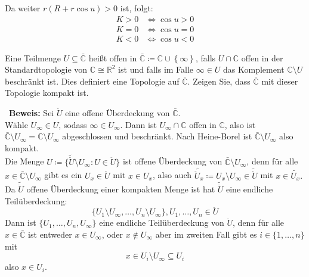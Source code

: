 Da weiter \( r(R + r \cos u) > 0 \) ist, folgt: 
\begin{align*}
  K > 0 &\Leftrightarrow \cos u > 0 \\
  K = 0 &\Leftrightarrow \cos u = 0 \\
  K < 0 &\Leftrightarrow \cos u < 0
\end{align*}
\begin{problem}[1]
  
  \begin{assignment}
    Eine Teilmenge \( U \subseteq \bar{\mathbb{C}} \) heißt offen in \( \bar{\mathbb{C}} \coloneqq \mathbb{C} \cup \left \{ \infty \right \} \), falls \( U \cap \mathbb{C} \) offen in der Standardtopologie von \( \mathbb{C} \cong \mathbb{R}^2 \) ist und falls im Falle \( \infty \in U \) das Komplement \( \mathbb{C} \setminus U \) beschränkt ist. Dies definiert eine Topologie auf \( \bar{\mathbb{C}} \).
    Zeigen Sie, dass \( \bar{\mathbb{C}} \) mit dieser Topologie kompakt ist.
  \end{assignment}
  \begin{solution}
    \
    \textbf{Beweis:} Sei \( \ddot{U} \) eine offene Überdeckung von \( \bar{\mathbb{C}} \). \\
    Wähle \( U_{\infty} \in U \), sodass \( \infty \in U_{\infty} \). Dann ist \( U_{\infty} \cap \mathbb{C} \) offen in \( \mathbb{C} \), also ist \( \bar{\mathbb{C}} \setminus U_{\infty} = \mathbb{C} \setminus U_{\infty} \) abgeschlossen und beschränkt. Nach Heine-Borel ist \( \bar{\mathbb{C}} \setminus U_{\infty} \) also kompakt. \\
    Die Menge \( U \coloneqq \{ \tilde{\ddot{U}} \setminus U_{\infty} : U \in \ddot{U} \} \) ist offene Überdeckung von \( \bar{\mathbb{C}} \setminus U_{\infty} \), denn für alle \( x \in \bar{\mathbb{C}} \setminus U_{\infty} \) gibt es ein \( U_x \in \ddot{U} \) mit \( x \in U_x \), also auch \( \tilde{\ddot{U}_x} \coloneqq U_x \setminus U_{\infty} \in \tilde{\ddot{U}} \) mit \( x \in \tilde{U_x}. \) \\
    Da \( \tilde{\ddot{U}} \) offene Überdeckung einer kompakten Menge ist hat \( \tilde{\ddot{U}} \) eine endliche Teilüberdeckung: 
    \begin{equation*}
      \{ U_1 \setminus U_{\infty}, \dots, U_n \setminus U_{\infty} \}, U_1, \dots, U_n \in \ddot{U}
    \end{equation*}
    Dann ist \( \{ U_1, \dots, U_n, U_{\infty} \} \) eine endliche Teilüberdeckung von \( \ddot{U} \), denn für alle
    \( x \in \bar{\mathbb{C}} \) ist entweder \( x \in U_{\infty} \), oder \( x \notin U_{\infty} \) aber im zweiten Fall gibt es \( i \in \{ 1, \dots, n \} \) mit 
    \begin{equation*}
      x \in U_i \setminus U_{\infty} \subseteq U_i
    \end{equation*} 
    also \( x \in U_i \). 
  \end{solution}
\end{problem}

